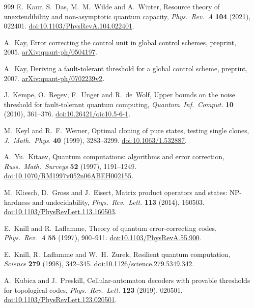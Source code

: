 \begin{thebibliography}{999}
E.~Kaur, S.~Das, M.~M.~Wilde and A.~Winter,
Resource theory of unextendibility and non-asymptotic quantum capacity,
\emph{Phys.~Rev.~A} \textbf{104} (2021), 022401.
\href{https://doi.org/10.1103/PhysRevA.104.022401}{doi:10.1103/PhysRevA.104.022401}.

A.~Kay,
Error correcting the control unit in global control schemes,
preprint, 2005.
\href{https://arxiv.org/abs/quant-ph/0504197}{arXiv:quant-ph/0504197}.

A.~Kay,
Deriving a fault-tolerant threshold for a global control scheme,
preprint, 2007.
\href{https://arxiv.org/abs/quant-ph/0702239v2}{arXiv:quant-ph/0702239v2}.

J.~Kempe, O.~Regev, F.~Unger and R.~de~Wolf,
Upper bounds on the noise threshold for fault-tolerant quantum computing,
\emph{Quantum~Inf.~Comput.} \textbf{10} (2010), 361--376.
\href{https://doi.org/10.26421/qic10.5-6-1}{doi:10.26421/qic10.5-6-1}.

M.~Keyl and R.~F.~Werner,
Optimal cloning of pure states, testing single clones,
\emph{J.~Math.~Phys.} \textbf{40} (1999), 3283--3299.
\href{https://doi.org/10.1063/1.532887}{doi:10.1063/1.532887}.

A.~Yu.~Kitaev,
Quantum computations: algorithms and error correction,
\emph{Russ.~Math.~Surveys} \textbf{52} (1997), 1191--1249.
\href{https://doi.org/10.1070/RM1997v052n06ABEH002155}{doi:10.1070/RM1997v052n06ABEH002155}.

M.~Kliesch, D.~Gross and J.~Eisert,
Matrix product operators and states: NP-hardness and undecidability,
\emph{Phys.~Rev.~Lett.} \textbf{113} (2014), 160503.
\href{https://doi.org/10.1103/PhysRevLett.113.160503}{doi:10.1103/PhysRevLett.113.160503}.

E.~Knill and R.~Laflamme,
Theory of quantum error-correcting codes,
\emph{Phys.~Rev.~A} \textbf{55} (1997), 900--911.
\href{https://doi.org/10.1103/PhysRevA.55.900}{doi:10.1103/PhysRevA.55.900}.

E.~Knill, R.~Laflamme and W.~H.~Zurek,
Resilient quantum computation,
\emph{Science} \textbf{279} (1998), 342--345.
\href{https://doi.org/10.1126/science.279.5349.342}{doi:10.1126/science.279.5349.342}.

A.~Kubica and J.~Preskill,
Cellular-automaton decoders with provable thresholds for topological codes,
\emph{Phys.~Rev.~Lett.} \textbf{123} (2019), 020501.
\href{https://doi.org/10.1103/PhysRevLett.123.020501}{doi:10.1103/PhysRevLett.123.020501}.


\end{thebibliography}
